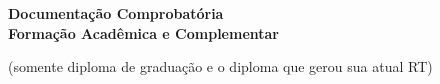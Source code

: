 \label{documentacao-probatoria-formacao}

\begin{center}
	\begin{LARGE}
		\textbf{Documentação Comprobatória\\
		\vspace{0.2in}
		Formação Acadêmica e Complementar}
	\end{LARGE}
\end{center}

\begin{center}
	{\color{red}(somente diploma de graduação e o diploma que gerou sua atual RT)}
\end{center}